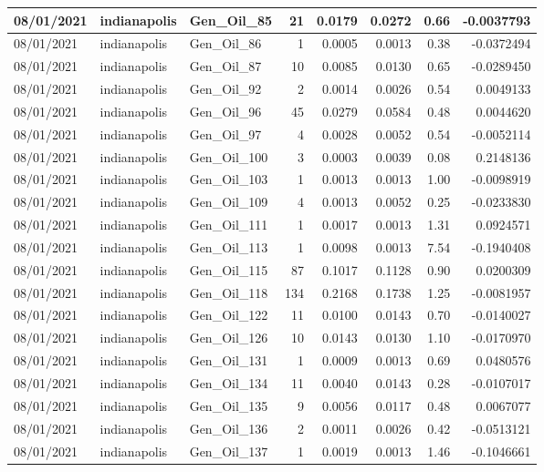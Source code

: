 \documentclass[
  letterpaper,
  DIV=11,
  numbers=noendperiod]{scrartcl}
\begin{document}
\begin{tabular}{l|l|l|r|r|r|r|r}
\hline
08/01/2021 & indianapolis & Gen\_Oil\_85 & 21 & 0.0179 & 0.0272 & 0.66 & -0.0037793\\
\hline
08/01/2021 & indianapolis & Gen\_Oil\_86 & 1 & 0.0005 & 0.0013 & 0.38 & -0.0372494\\
\hline
08/01/2021 & indianapolis & Gen\_Oil\_87 & 10 & 0.0085 & 0.0130 & 0.65 & -0.0289450\\
\hline
08/01/2021 & indianapolis & Gen\_Oil\_92 & 2 & 0.0014 & 0.0026 & 0.54 & 0.0049133\\
\hline
08/01/2021 & indianapolis & Gen\_Oil\_96 & 45 & 0.0279 & 0.0584 & 0.48 & 0.0044620\\
\hline
08/01/2021 & indianapolis & Gen\_Oil\_97 & 4 & 0.0028 & 0.0052 & 0.54 & -0.0052114\\
\hline
08/01/2021 & indianapolis & Gen\_Oil\_100 & 3 & 0.0003 & 0.0039 & 0.08 & 0.2148136\\
\hline
08/01/2021 & indianapolis & Gen\_Oil\_103 & 1 & 0.0013 & 0.0013 & 1.00 & -0.0098919\\
\hline
08/01/2021 & indianapolis & Gen\_Oil\_109 & 4 & 0.0013 & 0.0052 & 0.25 & -0.0233830\\
\hline
08/01/2021 & indianapolis & Gen\_Oil\_111 & 1 & 0.0017 & 0.0013 & 1.31 & 0.0924571\\
\hline
08/01/2021 & indianapolis & Gen\_Oil\_113 & 1 & 0.0098 & 0.0013 & 7.54 & -0.1940408\\
\hline
08/01/2021 & indianapolis & Gen\_Oil\_115 & 87 & 0.1017 & 0.1128 & 0.90 & 0.0200309\\
\hline
08/01/2021 & indianapolis & Gen\_Oil\_118 & 134 & 0.2168 & 0.1738 & 1.25 & -0.0081957\\
\hline
08/01/2021 & indianapolis & Gen\_Oil\_122 & 11 & 0.0100 & 0.0143 & 0.70 & -0.0140027\\
\hline
08/01/2021 & indianapolis & Gen\_Oil\_126 & 10 & 0.0143 & 0.0130 & 1.10 & -0.0170970\\
\hline
08/01/2021 & indianapolis & Gen\_Oil\_131 & 1 & 0.0009 & 0.0013 & 0.69 & 0.0480576\\
\hline
08/01/2021 & indianapolis & Gen\_Oil\_134 & 11 & 0.0040 & 0.0143 & 0.28 & -0.0107017\\
\hline
08/01/2021 & indianapolis & Gen\_Oil\_135 & 9 & 0.0056 & 0.0117 & 0.48 & 0.0067077\\
\hline
08/01/2021 & indianapolis & Gen\_Oil\_136 & 2 & 0.0011 & 0.0026 & 0.42 & -0.0513121\\
\hline
08/01/2021 & indianapolis & Gen\_Oil\_137 & 1 & 0.0019 & 0.0013 & 1.46 & -0.1046661\\

\end{tabular}
\end{document}
